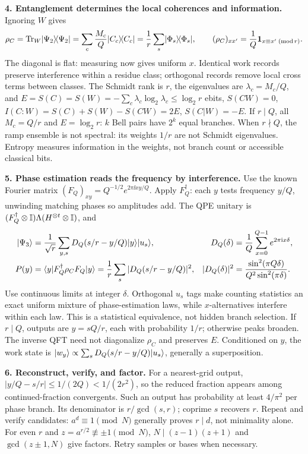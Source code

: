 \textbf{4. Entanglement determines the local coherences and information.}
Ignoring \(W\) gives
\[
\rho_C=\operatorname{Tr}_W\lvert\Psi_2\rangle\!\langle\Psi_2\rvert
=\sum_c\frac{M_c}{Q}\lvert C_c\rangle\!\langle C_c\rvert=\frac1r\sum_s\lvert\Phi_s\rangle\!\langle\Phi_s\rvert,
\qquad (\rho_C)_{xx'}=\frac1Q\mathbf1_{x\equiv x'\; (\mathrm{mod}\,r)}.
\]
The diagonal is flat: measuring now gives uniform \(x\). Identical work records preserve interference within a residue class; orthogonal records remove local cross terms between classes. The Schmidt rank is \(r\), the eigenvalues are \(\lambda_c=M_c/Q\), and
\(E=S(C)=S(W)=-\sum_c\lambda_c\log_2\lambda_c\le\log_2r\) ebits, \(S(CW)=0\), \(I(C:W)=S(C)+S(W)-S(CW)=2E\), \(S(C|W)=-E\).
If \(r\mid Q\), all \(M_c=Q/r\) and \(E=\log_2r\): \(k\) Bell pairs have \(2^k\) equal branches. When \(r\nmid Q\), the ramp ensemble is not spectral: its weights \(1/r\) are not Schmidt eigenvalues. Entropy measures information in the weights, not branch count or accessible classical bits.

\textbf{5. Phase estimation reads the frequency by interference.}
Use the known Fourier matrix \((F_Q)_{xy}=Q^{-1/2}e^{2\pi\ii xy/Q}\). Apply \(F_Q^\dagger\): each \(y\) tests frequency \(y/Q\), unwinding matching phases so amplitudes add. The QPE unitary is \((F_Q^\dagger\otimes\mathbb I)\Lambda(H^{\otimes t}\otimes\mathbb I)\), and
\[
\begin{aligned}
\lvert\Psi_3\rangle&=\frac1{\sqrt r}\sum_{y,s}D_Q(s/r-y/Q)\lvert y\rangle\lvert u_s\rangle,
&D_Q(\delta)&=\frac1Q\sum_{x=0}^{Q-1}e^{2\pi\mathrm{i} x\delta},\\[-1pt]
P(y)&=\langle y\rvert F_Q^\dagger\rho_CF_Q\lvert y\rangle
=\frac1r\sum_s|D_Q(s/r-y/Q)|^2,
&|D_Q(\delta)|^2&=\frac{\sin^2(\pi Q\delta)}{Q^2\sin^2(\pi\delta)}.
\end{aligned}
\]
Use continuous limits at integer \(\delta\). Orthogonal \(u_s\) tags make counting statistics an exact uniform mixture of phase-estimation laws, while \(x\)-alternatives interfere within each law. This is a statistical equivalence, not hidden branch selection. If \(r\mid Q\), outputs are \(y=sQ/r\), each with probability \(1/r\); otherwise peaks broaden. The inverse QFT need not diagonalize \(\rho_C\) and preserves \(E\). Conditioned on \(y\), the work state is \(\lvert w_y\rangle\propto\sum_sD_Q(s/r-y/Q)\lvert u_s\rangle\), generally a superposition.

\textbf{6. Reconstruct, verify, and factor.}
For a nearest-grid output, \(|y/Q-s/r|\le1/(2Q)<1/(2r^2)\), so the reduced fraction appears among continued-fraction convergents. Such an output has probability at least \(4/\pi^2\) per phase branch. Its denominator is \(r/\gcd(s,r)\); coprime \(s\) recovers \(r\). Repeat and verify candidates: \(a^d\equiv1\pmod N\) generally proves \(r\mid d\), not minimality alone. For even \(r\) and \(z=a^{r/2}\not\equiv\pm1\pmod N\), \(N\mid(z-1)(z+1)\) and \(\gcd(z\pm1,N)\) give factors. Retry samples or bases when necessary.


